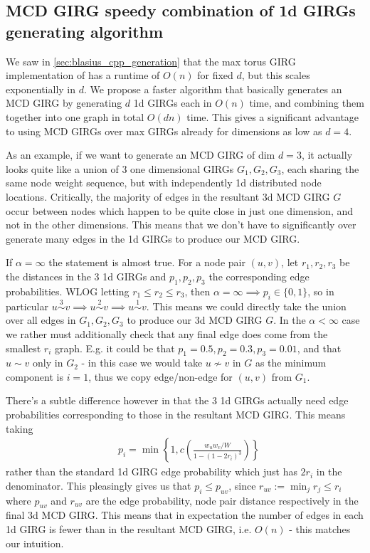\subsection{MCD GIRG speedy combination of 1d GIRGs generating algorithm}
We saw in \cref{sec:blasius_cpp_generation} that the max torus GIRG implementation of \cite{blasius2022efficiently} has a runtime of $O(n)$ for fixed $d$, but this scales exponentially in $d$. We propose a faster algorithm that basically generates an MCD GIRG by generating $d$ 1d GIRGs each in $O(n)$ time, and combining them together into one graph in total $O(dn)$ time. This gives a significant advantage to using MCD GIRGs over max GIRGs already for dimensions as low as $d=4$.

As an example, if we want to generate an MCD GIRG of dim $d=3$, it actually looks quite like a union of $3$ one dimensional GIRGs $G_1, G_2, G_3$, each sharing the same node weight sequence, but with independently 1d distributed node locations. Critically, the majority of edges in the resultant 3d MCD GIRG $G$ occur between nodes which happen to be quite close in just one dimension, and not in the other dimensions. This means that we don't have to significantly over generate many edges in the 1d GIRGs to produce our MCD GIRG.

If $\alpha=\infty$ the  statement is almost true. For a node pair $(u,v)$, let $r_1, r_2, r_3$ be the distances in the $3$ 1d GIRGs and $p_1, p_2, p_3$ the corresponding edge probabilities. WLOG letting $r_1 \leq r_2 \leq r_3$, then $\alpha = \infty \implies p_i \in \{0, 1\}$, so in particular $u \stackrel{3}{\sim} v \implies u \stackrel{2}{\sim} v \implies u \stackrel{1}{\sim} v$. This means we could directly take the union over all edges in $G_1, G_2, G_3$ to produce our 3d MCD GIRG $G$. In the $\alpha < \infty$ case we rather must additionally check that any final edge does come from the smallest $r_i$ graph. E.g. it could be that $p_1 = 0.5, p_2 = 0.3, p_3 = 0.01$, and that $u \sim v$ only in $G_2$ - in this case we would take $u \not \sim v$ in $G$ as the minimum component is $i=1$, thus we copy edge/non-edge for $(u, v)$ from $G_1$. 

There's a subtle difference however in that the $3$ 1d GIRGs actually need edge probabilities corresponding to those in the resultant MCD GIRG. This means taking
\begin{align*}
    & p_i = \min \left \{
        1, c \left ( 
            \frac{w_u w_v / W}{1 - (1 - 2 r_i)^3}
        \right )     
    \right \}
\end{align*}
rather than the standard 1d GIRG edge probability which just has $2 r_i$ in the denominator. This pleasingly gives us that $p_i \leq p_{uv}$, since $r_{uv} := \min_j r_j \leq r_i$ where $p_{uv}$ and $r_{uv}$ are the edge probability, node pair distance respectively in the final 3d MCD GIRG. This means that in expectation the number of edges in each 1d GIRG is fewer than in the resultant MCD GIRG, i.e. $O(n)$ - this matches our  intuition.


